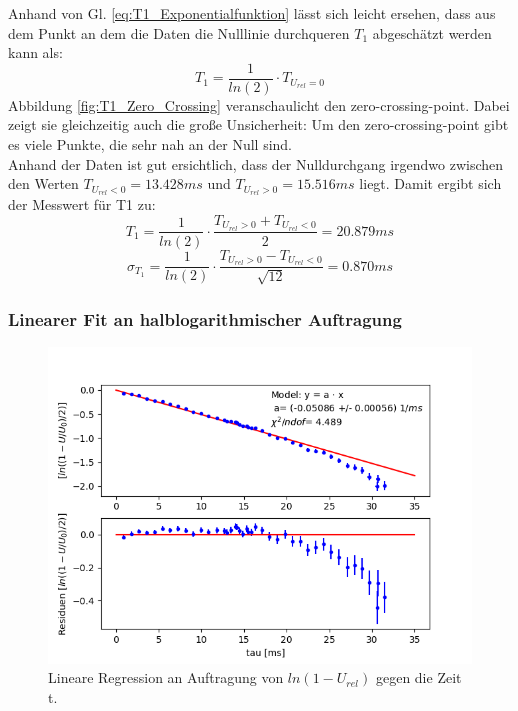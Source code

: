 \documentclass[12pt,a4paper]{article}
\begin{document}
Anhand von Gl. \ref{eq:T1_Exponentialfunktion} lässt sich leicht ersehen, dass aus dem Punkt an dem die Daten die Nulllinie durchqueren $T_1$ abgeschätzt werden kann als:
\begin{equation*}
T_1 = \dfrac{1}{ln(2)} \cdot T_{U_{rel} = 0}
\end{equation*}
Abbildung \ref{fig:T1_Zero_Crossing} veranschaulicht den zero-crossing-point. Dabei zeigt sie gleichzeitig auch die große Unsicherheit: Um den zero-crossing-point gibt es viele Punkte, die sehr nah an der Null sind. \\ 
Anhand der Daten ist gut ersichtlich, dass der Nulldurchgang irgendwo zwischen den Werten $T_{U_{rel} < 0} = 13.428ms$ und $T_{U_{rel} > 0} = 15.516ms$ liegt. Damit ergibt sich der Messwert für T1 zu:
\begin{equation*}
T_1 = \dfrac{1}{ln(2)} \cdot \dfrac{T_{U_{rel} > 0} + T_{U_{rel} < 0}}{2} = 20.879 ms
\end{equation*}
\begin{equation*}
\sigma _{T_1} = \dfrac{1}{ln(2)} \cdot \dfrac{T_{U_{rel} > 0} - T_{U_{rel} < 0}}{\sqrt{12}} = 0.870 ms
\end{equation*}

\subsubsection{Linearer Fit an halblogarithmischer Auftragung}

\begin{figure}
\centering
\includegraphics[scale=0.7]{Bilder/T1_linFit_halblog.PNG}
\caption{Lineare Regression an Auftragung von $ln(1-U_{rel})$ gegen die Zeit t.}
\label{fig:T1_linFit}
\end{figure}
\end{document}
